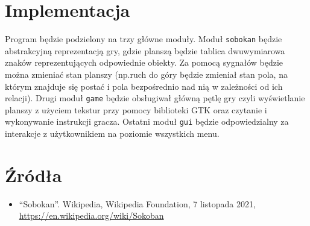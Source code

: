 \documentclass[9pt]{article}
\begin{document}
\section*{Implementacja}
Program będzie podzielony na trzy główne moduły. Moduł \texttt{sobokan} będzie
abstrakcyjną reprezentacją gry, gdzie planszą będzie tablica dwuwymiarowa
znaków reprezentujących odpowiednie obiekty. Za pomocą sygnałów będzie można 
zmieniać stan planszy (np.ruch do góry będzie zmieniał stan pola, na którym
znajduje się postać i pola bezpośrednio nad nią w zależności od ich relacji). Drugi 
moduł \texttt{game} będzie 
obsługiwał główną pętlę gry czyli wyświetlanie planszy z użyciem tekstur przy
pomocy biblioteki GTK oraz czytanie i wykonywanie instrukcji gracza. 
Ostatni moduł \texttt{gui} będzie odpowiedzialny za interakcje z użytkownikiem 
na poziomie wszystkich menu.

\section*{Źródła}
\begin{itemize}
    \item ``Sobokan''. Wikipedia, Wikipedia Foundation, 7 listopada 2021, 
        \url{https://en.wikipedia.org/wiki/Sokoban}
\end{itemize}
\end{document}
